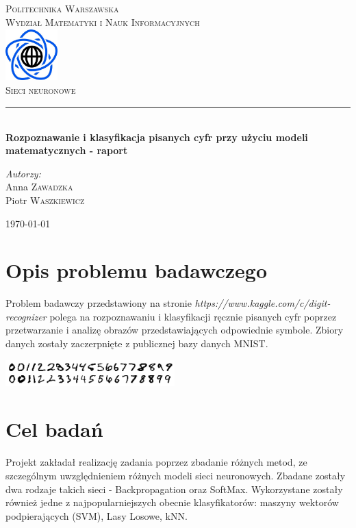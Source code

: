 \documentclass{article}
\begin{document}
\begin{titlepage}
\newcommand{\HRule}{\rule{\linewidth}{0.5mm}}
\begin{center}
\textsc{\LARGE Politechnika Warszawska}\\[0.5cm]
\textsc{\Large Wydział Matematyki i Nauk Informacyjnych}\\[1cm]
\includegraphics[width=2cm, height=2cm]{logo}\\[1cm]
\textsc{\Huge Sieci neuronowe}\\[0.5cm]
\HRule \\[0.4cm]
{ \LARGE \bfseries Rozpoznawanie i klasyfikacja pisanych cyfr przy użyciu modeli matematycznych - raport}\\[4cm]
\begin{flushright}
\Large \emph{Autorzy:}\\[0.5cm]
Anna \textsc{Zawadzka}\\
Piotr \textsc{Waszkiewicz}\\[2.5cm]
\end{flushright} 
\vfill
{\large \today}\\[1cm]	
\end{center}
\end{titlepage}

\newpage
\section{Opis problemu badawczego}
Problem badawczy przedstawiony na stronie \textit{https://www.kaggle.com/c/digit-recognizer} polega na rozpoznawaniu i klasyfikacji ręcznie pisanych cyfr poprzez przetwarzanie i analizę obrazów przedstawiających odpowiednie symbole. Zbiory danych zostały zaczerpnięte z publicznej bazy danych  MNIST\cite{mnist_database}. 
\begin{center}
\includegraphics[width=0.49\textwidth]{native}
\end{center}

\section{Cel badań}
Projekt zakładał realizację zadania poprzez zbadanie różnych metod, ze szczególnym uwzględnieniem różnych modeli sieci neuronowych. Zbadane zostały dwa rodzaje takich sieci - Backpropagation oraz SoftMax. Wykorzystane zostały również jedne z najpopularniejszych obecnie klasyfikatorów: maszyny wektorów podpierających (SVM)\cite{CortesVapnik1995}, Lasy Losowe\cite{RF}, kNN\cite{Altman1992}.
\end{document}
